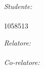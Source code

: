 \documentclass[
12pt, %
english, %
onehalfspacing, %
headsepline, %
]{MastersDoctoralThesis} %
\begin{document}
\begin{titlepage}
\begin{center}
\begin{minipage}[t]{0.4\textwidth}
\begin{flushleft} \large
\emph{Studente:}\\
\authorname\\1058513 %
\end{flushleft}
\end{minipage}
\begin{minipage}[t]{0.5\textwidth}
\begin{flushright} \large
\emph{Relatore:} \\
\supname\\ %
\emph{Co-relatore:} \\
\cosupname %
\end{flushright}
\end{minipage}\\[3cm]

 
\vfill
\end{center}
\end{titlepage}

\cleardoublepage


%
%

\end{document}
